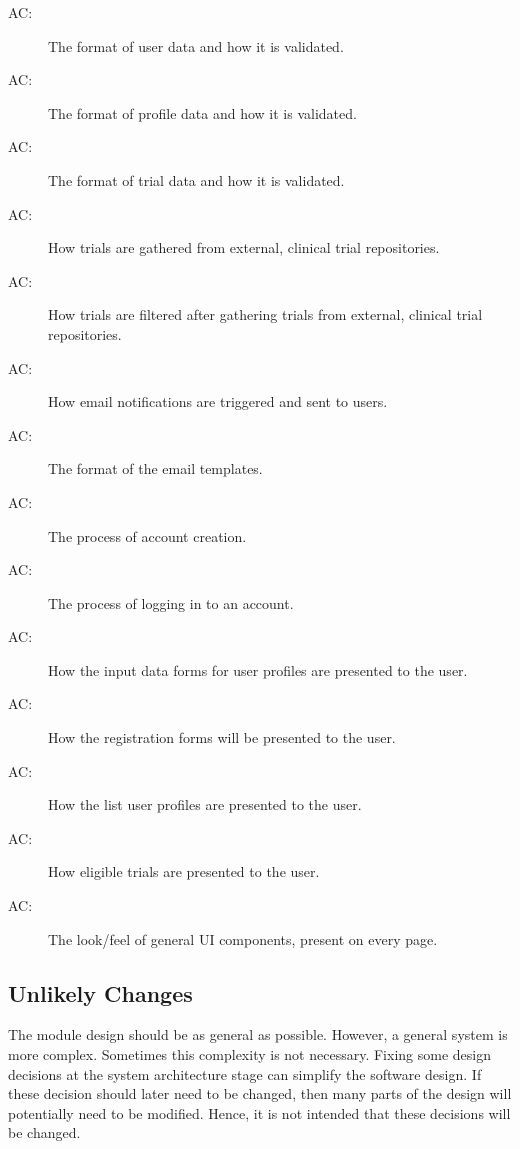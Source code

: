 \documentclass[12pt, titlepage]{article}
\newcounter{acnum}
\newcommand{\actheacnum}{AC\theacnum}
\begin{document}
\begin{description}
\item[ \actheacnum:] The format of user data and how it is validated.
\item[ \actheacnum:] The format of profile data and how it is validated.
\item[ \actheacnum:] The format of trial data and how it is validated.
\item[ \actheacnum:] How trials are gathered from external, clinical trial repositories.
\item[ \actheacnum:] How trials are filtered after gathering trials from external, clinical trial repositories.
\item[ \actheacnum:] How email notifications are triggered and sent to users.
\item[ \actheacnum:] The format of the email templates.
\item[ \actheacnum:] The process of account creation.
\item[ \actheacnum:] The process of logging in to an account.
\item[ \actheacnum:] How the input data forms for user profiles are presented to the user.
\item[ \actheacnum:] How the registration forms will be presented to the user.
\item[ \actheacnum:] How the list user profiles are presented to the user.
\item[ \actheacnum:] How eligible trials are presented to the user.
\item[ \actheacnum:] The look/feel of general UI components, present on every page.
\end{description}

\subsection{Unlikely Changes} \label{SecUchange}

The module design should be as general as possible. However, a general system is
more complex. Sometimes this complexity is not necessary. Fixing some design
decisions at the system architecture stage can simplify the software design. If
these decision should later need to be changed, then many parts of the design
will potentially need to be modified. Hence, it is not intended that these
decisions will be changed.
\end{document}
